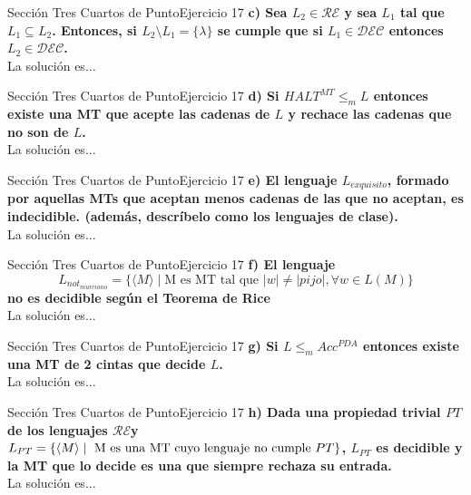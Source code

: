 \documentclass[10pt, envcountsect, presentation, aspectratio=169]{beamer}
\newcommand{\ld}{\ensuremath{\mathcal {DEC}}}
\newcommand{\lr}{\ensuremath{\mathcal {RE}}}
\begin{document}

\begin{frame}{Sección Tres Cuartos de Punto}{Ejercicio 17}
    \textbf{c) Sea $L_2 \in \lr$ y sea $L_1$ tal que $L_1 \subseteq L_2$. Entonces, si $L_2 \setminus L_1=\{\lambda\}$ se cumple que si $L_1 \in \ld$ entonces $L_2 \in \ld$.}\\
    La solución es...
\end{frame}


\begin{frame}{Sección Tres Cuartos de Punto}{Ejercicio 17}
    \textbf{d) Si $HALT^{MT} \le_m L$ entonces existe una MT  que acepte las cadenas de $L$ y rechace las cadenas que no son de $L$.}\\
    La solución es...
\end{frame}


\begin{frame}{Sección Tres Cuartos de Punto}{Ejercicio 17}
    \textbf{e) El lenguaje $L_{exquisito}$, formado por aquellas MTs que aceptan menos cadenas de las que no aceptan, es indecidible. (además, descríbelo como los lenguajes de clase).}\\
    La solución es...
\end{frame}


\begin{frame}{Sección Tres Cuartos de Punto}{Ejercicio 17}
    \textbf{f) El lenguaje $$L_{not_{murciano}}=\{\langle M \rangle \mid \mbox{M es MT  tal que } |w|\neq |pijo|,  \forall w \in L(M) \}$$  no es decidible según el Teorema de Rice}\\
    La solución es...
\end{frame}


\begin{frame}{Sección Tres Cuartos de Punto}{Ejercicio 17}
    \textbf{g) Si $L\le_m  Acc^{PDA}$ entonces existe una MT de 2 cintas que decide $L$. }\\
    La solución es...
\end{frame}


\begin{frame}{Sección Tres Cuartos de Punto}{Ejercicio 17}
    \textbf{h) Dada  una propiedad trivial $PT$ de los lenguajes \lr y $L_{PT}=\{\langle M \rangle \mid \hbox{ M es una MT cuyo lenguaje no cumple } PT\}$, $L_{PT}$ es decidible y la MT que lo decide es una que siempre rechaza su entrada.}\\
    La solución es...
\end{frame}
\end{document}
